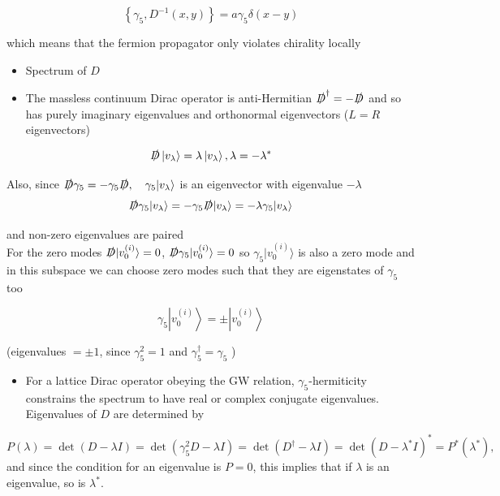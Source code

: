 \begin{equation}
\left\{\gamma_5, D^{-1}(x, y)\right\}=a \gamma_{5} \delta(x-y)
\end{equation}

which means that the fermion propagator only violates chirality locally

\begin{itemize}
  \item Spectrum of $D$
  \item The massless continuum Dirac operator is anti-Hermitian \(\slashed{D}^{\dagger}=-\slashed{D}\) and so has purely imaginary eigenvalues and orthonormal eigenvectors (\(L=R\) eigenvectors)
\end{itemize}

\begin{equation}
\slashed{D}\left|v_{\lambda}\right\rangle=\lambda\left|v_{\lambda}\right\rangle, \lambda=-\lambda^{*}
\end{equation}

Also, since \(\slashed{D} \gamma_5 = - \gamma_5 \slashed{D}, \quad \gamma_5 |v_\lambda\rangle\) is an eigenvector with eigenvalue $-\lambda$
\begin{equation}
    \slashed{D}\gamma_5 |v_\lambda \rangle = - \gamma_5 \slashed{D} |v_\lambda\rangle = - \lambda \gamma_5 |v_\lambda\rangle
\end{equation}

and non-zero eigenvalues are paired\\
For the zero modes $\slashed{D}|v_0^{(i)}\rangle = 0$, $\slashed{D}\gamma_5 | v_0^{(i)}\rangle = 0$ so $\gamma_5|v_0^{(i)}\rangle$ is also a zero mode and in this subspace we can choose zero modes such that they are eigenstates of \(\gamma_5\) too

\begin{equation}
\gamma_{5}\left|v_{0}^{(i)}\right\rangle= \pm\left|v_{0}^{(i)}\right\rangle
\end{equation}

(eigenvalues \(= \pm 1\), since \(\gamma_{5}^{2}=1\) and \(\gamma^\dagger_5=\gamma_5\) )

\begin{itemize}
  \item For a lattice Dirac operator obeying the GW relation, \(\gamma_{5}\)-hermiticity constrains the spectrum to have real or complex conjugate eigenvalues. Eigenvalues of \(D\) are determined by
\end{itemize}
\begin{equation}
    P(\lambda) = \operatorname{det}(D-\lambda I) = \operatorname{det}(\gamma_5^2D - \lambda I) = \operatorname{det}(D^\dagger - \lambda I) = \operatorname{det}(D - \lambda^* I)^* = P^*(\lambda^*),
\end{equation}
and since the condition for an eigenvalue is $P = 0$, this implies that if $\lambda$ is an eigenvalue, so is $\lambda^*$.

